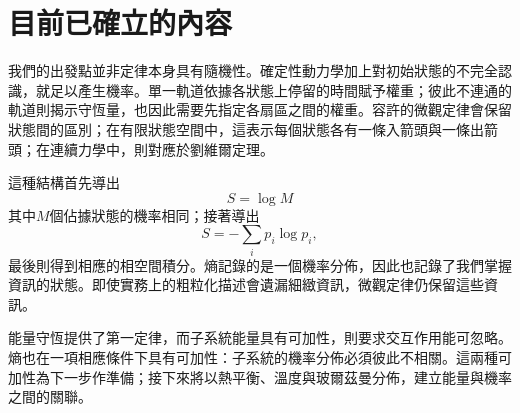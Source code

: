 \begin{classroomqa}
\end{classroomqa}

\section{目前已確立的內容}

我們的出發點並非定律本身具有隨機性。確定性動力學加上對初始狀態的不完全認識，就足以產生機率。單一軌道依據各狀態上停留的時間賦予權重；彼此不連通的軌道則揭示守恆量，也因此需要先指定各扇區之間的權重。容許的微觀定律會保留狀態間的區別；在有限狀態空間中，這表示每個狀態各有一條入箭頭與一條出箭頭；在連續力學中，則對應於劉維爾定理。

這種結構首先導出
\begin{equation}
 S=\log M
\end{equation}
其中\(M\)個佔據狀態的機率相同；接著導出
\begin{equation}
 S=-\sum_i p_i\log p_i,
\end{equation}
最後則得到相應的相空間積分。熵記錄的是一個機率分佈，因此也記錄了我們掌握資訊的狀態。即使實務上的粗粒化描述會遺漏細緻資訊，微觀定律仍保留這些資訊。

能量守恆提供了第一定律，而子系統能量具有可加性，則要求交互作用能可忽略。熵也在一項相應條件下具有可加性：子系統的機率分佈必須彼此不相關。這兩種可加性為下一步作準備；接下來將以熱平衡、溫度與玻爾茲曼分佈，建立能量與機率之間的關聯。